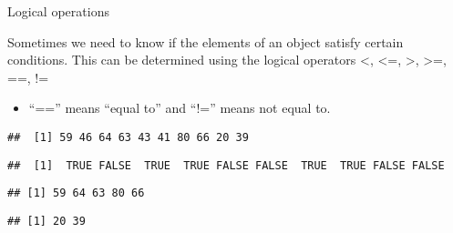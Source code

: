 \begin{frame}[fragile]{Logical operations}
\protect\hypertarget{logical-operations}{}

Sometimes we need to know if the elements of an object satisfy certain
conditions. This can be determined using the logical operators
\textless, \textless=, \textgreater, \textgreater=, ==, !=

\begin{itemize}
\tightlist
\item
  ``=='' means ``equal to'' and ``!='' means not equal to.
\end{itemize}

\begin{Shaded}
\begin{Highlighting}[]
\StringTok{ }\NormalTok{(}\OperatorTok{:}\NormalTok{,}\NormalTok{)}
\end{Highlighting}
\end{Shaded}

\begin{verbatim}
##  [1] 59 46 64 63 43 41 80 66 20 39
\end{verbatim}

\begin{Shaded}
\begin{Highlighting}[]
\OperatorTok{>} 
\end{Highlighting}
\end{Shaded}

\begin{verbatim}
##  [1]  TRUE FALSE  TRUE  TRUE FALSE FALSE  TRUE  TRUE FALSE FALSE
\end{verbatim}

\begin{Shaded}
\begin{Highlighting}[]
\NormalTok{a[a}\OperatorTok{>}\NormalTok{] }
\end{Highlighting}
\end{Shaded}

\begin{verbatim}
## [1] 59 64 63 80 66
\end{verbatim}

\begin{Shaded}
\begin{Highlighting}[]
\NormalTok{a[a}\OperatorTok{<=}\NormalTok{] }
\end{Highlighting}
\end{Shaded}

\begin{verbatim}
## [1] 20 39
\end{verbatim}

\end{frame}

